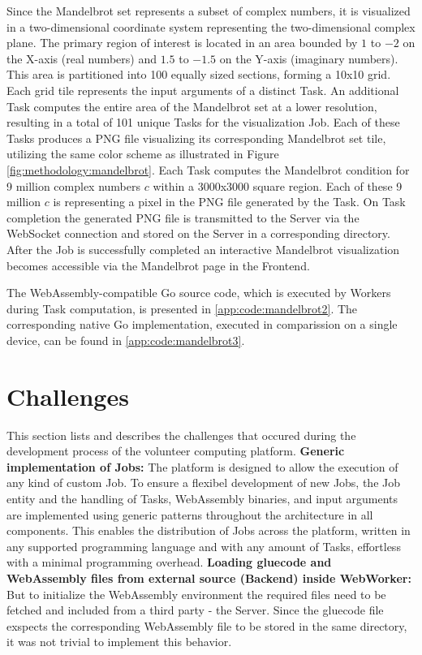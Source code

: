 Since the Mandelbrot set represents a subset of complex numbers, it is visualized in a two-dimensional coordinate system representing the two-dimensional complex plane. The primary region of interest is located in an area bounded by $1$ to $-2$ on the X-axis (real numbers) and $1.5$ to $-1.5$ on the Y-axis (imaginary numbers). This area is partitioned into 100 equally sized sections, forming a 10x10 grid. Each grid tile represents the input arguments of a distinct Task. An additional Task computes the entire area of the Mandelbrot set at a lower resolution, resulting in a total of 101 unique Tasks for the visualization Job. Each of these Tasks produces a \ac{PNG} file visualizing its corresponding Mandelbrot set tile, utilizing the same color scheme as illustrated in Figure \ref{fig:methodology:mandelbrot}. Each Task computes the Mandelbrot condition for 9 million complex numbers $c$ within a 3000x3000 square region. Each of these 9 million $c$ is representing a pixel in the \ac{PNG} file generated by the Task. On Task completion the generated \ac{PNG} file is transmitted to the Server via the WebSocket connection and stored on the Server in a corresponding directory. After the Job is successfully completed an interactive Mandelbrot visualization becomes accessible via the Mandelbrot page in the Frontend.

The WebAssembly-compatible Go source code, which is executed by Workers during Task computation, is presented in \ref{app:code:mandelbrot2}. The corresponding native Go implementation, executed in comparission on a single device, can be found in \ref{app:code:mandelbrot3}.

\section{Challenges}
\label{sec:implementation:challenges}
This section lists and describes the  challenges that occured during the development process of the volunteer computing platform.
\newline
\newline
\textbf{Generic implementation of Jobs:}
\newline
The platform is designed to allow the execution of any kind of custom Job. To ensure a flexibel development of new Jobs, the Job entity and the handling of Tasks, WebAssembly binaries, and input arguments are implemented using generic patterns throughout the architecture in all components. This enables the distribution of Jobs across the platform, written in any supported programming language and with any amount of Tasks, effortless with a minimal programming overhead.
\newline
\newline
\textbf{Loading gluecode and WebAssembly files from external source (Backend) inside WebWorker:}
\newline
But to initialize the WebAssembly environment the required files need to be fetched and included from a third party - the Server. Since the gluecode file exspects the corresponding WebAssembly file to be stored in the same directory, it was not trivial to implement this behavior.

